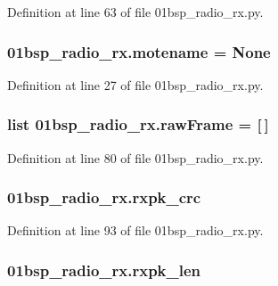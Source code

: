 Definition at line 63 of file 01bsp\+\_\+radio\+\_\+rx.\+py.

\subsubsection[{\texorpdfstring{motename}{motename}}]{\setlength{\rightskip}{0pt plus 5cm}01bsp\+\_\+radio\+\_\+rx.\+motename = None}\hypertarget{namespace01bsp__radio__rx_ae193588ed0cf6e039f855f040b00b2e1}{}\label{namespace01bsp__radio__rx_ae193588ed0cf6e039f855f040b00b2e1}


Definition at line 27 of file 01bsp\+\_\+radio\+\_\+rx.\+py.

\subsubsection[{\texorpdfstring{raw\+Frame}{rawFrame}}]{\setlength{\rightskip}{0pt plus 5cm}list 01bsp\+\_\+radio\+\_\+rx.\+raw\+Frame = \mbox{[}$\,$\mbox{]}}\hypertarget{namespace01bsp__radio__rx_a4fb6aafdc59522c766004b87f11e7aa1}{}\label{namespace01bsp__radio__rx_a4fb6aafdc59522c766004b87f11e7aa1}


Definition at line 80 of file 01bsp\+\_\+radio\+\_\+rx.\+py.

\subsubsection[{\texorpdfstring{rxpk\+\_\+crc}{rxpk_crc}}]{\setlength{\rightskip}{0pt plus 5cm}01bsp\+\_\+radio\+\_\+rx.\+rxpk\+\_\+crc}\hypertarget{namespace01bsp__radio__rx_a5d7d1fbf5723c2918de7500e9e50dce7}{}\label{namespace01bsp__radio__rx_a5d7d1fbf5723c2918de7500e9e50dce7}


Definition at line 93 of file 01bsp\+\_\+radio\+\_\+rx.\+py.

\subsubsection[{\texorpdfstring{rxpk\+\_\+len}{rxpk_len}}]{\setlength{\rightskip}{0pt plus 5cm}01bsp\+\_\+radio\+\_\+rx.\+rxpk\+\_\+len}\hypertarget{namespace01bsp__radio__rx_a61531cf1011a6bdd829422b751c13b86}{}\label{namespace01bsp__radio__rx_a61531cf1011a6bdd829422b751c13b86}


